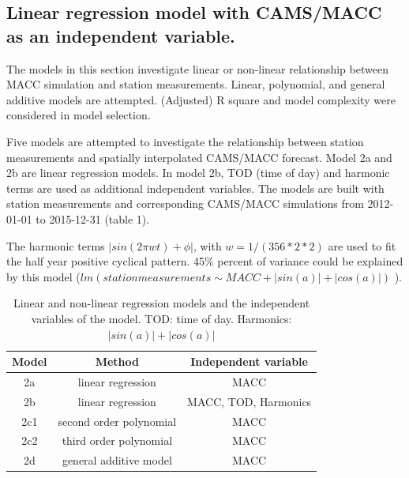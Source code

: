 \documentclass{article}
\begin{document}
\subsection{Linear regression model with CAMS/MACC as an independent variable.}

The models in this section investigate linear or non-linear
relationship between MACC simulation and station measurements. Linear,
polynomial, and general additive models are attempted. (Adjusted) R
square and model complexity were considered in model selection.
  
Five models are attempted to investigate the relationship between
station measurements and spatially interpolated CAMS/MACC
forecast. Model 2a and 2b are linear regression models. In model 2b,
TOD (time of day) and harmonic terms are used as additional
independent variables. The models are built with station measurements
and corresponding CAMS/MACC simulations from 2012-01-01 to 2015-12-31
(table 1).

The harmonic terms $|sin(2 \pi wt) + \phi|$, with
$w = 1 / (356 * 2 * 2)$ are used to fit the half year positive
cyclical pattern. 45\% percent of variance could be explained by this
model ($lm (station measurements \sim MACC + |sin(a)| + |cos(a)|)$
).

\begin{table}[tbp]
\centering
\begin{tabular}{ c c c }
  \toprule
Model & Method & Independent variable\\ \midrule

2a &linear regression & MACC   \\
2b &linear regression & MACC, TOD, Harmonics   \\
2c1 & second order polynomial & MACC \\  
2c2 & third order polynomial & MACC   \\ 
2d & general additive model & MACC  \\  \bottomrule
\end{tabular}
\caption{ Linear and non-linear regression models and the independent variables of the model. TOD: time of day. Harmonics: $ | sin(a)| + |cos(a)|$ } 
\label{table:1}
\end{table}
\end{document}
